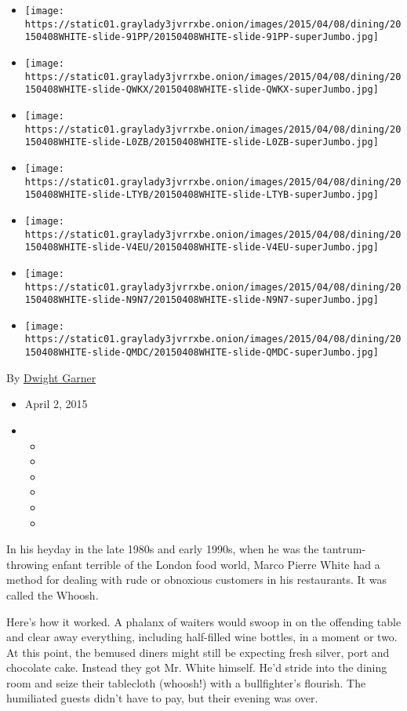 \begin{itemize}
\item
  \texttt{[image: https://static01.graylady3jvrrxbe.onion/images/2015/04/08/dining/20150408WHITE-slide-91PP/20150408WHITE-slide-91PP-superJumbo.jpg]}
\item
  \texttt{[image: https://static01.graylady3jvrrxbe.onion/images/2015/04/08/dining/20150408WHITE-slide-QWKX/20150408WHITE-slide-QWKX-superJumbo.jpg]}
\item
  \texttt{[image: https://static01.graylady3jvrrxbe.onion/images/2015/04/08/dining/20150408WHITE-slide-L0ZB/20150408WHITE-slide-L0ZB-superJumbo.jpg]}
\item
  \texttt{[image: https://static01.graylady3jvrrxbe.onion/images/2015/04/08/dining/20150408WHITE-slide-LTYB/20150408WHITE-slide-LTYB-superJumbo.jpg]}
\item
  \texttt{[image: https://static01.graylady3jvrrxbe.onion/images/2015/04/08/dining/20150408WHITE-slide-V4EU/20150408WHITE-slide-V4EU-superJumbo.jpg]}
\item
  \texttt{[image: https://static01.graylady3jvrrxbe.onion/images/2015/04/08/dining/20150408WHITE-slide-N9N7/20150408WHITE-slide-N9N7-superJumbo.jpg]}
\item
  \texttt{[image: https://static01.graylady3jvrrxbe.onion/images/2015/04/08/dining/20150408WHITE-slide-QMDC/20150408WHITE-slide-QMDC-superJumbo.jpg]}
\end{itemize}

By \href{http://www.nytimes3xbfgragh.onion/by/dwight-garner}{Dwight
Garner}

\begin{itemize}
\item
  April 2, 2015
\item
  \begin{itemize}
  \item
  \item
  \item
  \item
  \item
  \item
  \end{itemize}
\end{itemize}

In his heyday in the late 1980s and early 1990s, when he was the
tantrum-throwing enfant terrible of the London food world, Marco Pierre
White had a method for dealing with rude or obnoxious customers in his
restaurants. It was called the Whoosh.

Here's how it worked. A phalanx of waiters would swoop in on the
offending table and clear away everything, including half-filled wine
bottles, in a moment or two. At this point, the bemused diners might
still be expecting fresh silver, port and chocolate cake. Instead they
got Mr. White himself. He'd stride into the dining room and seize their
tablecloth (whoosh!) with a bullfighter's flourish. The humiliated
guests didn't have to pay, but their evening was over.

